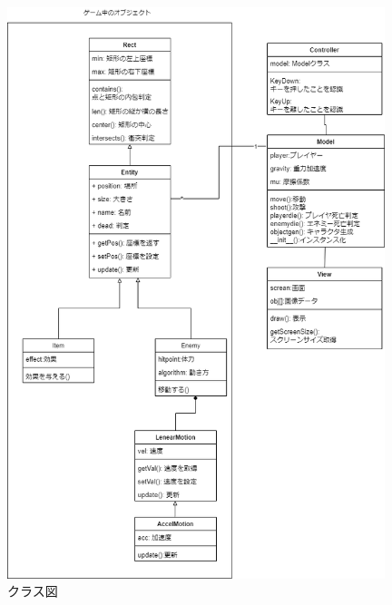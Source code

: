 \documentclass[11pt,a4paper]{jsarticle}
\begin{document}
\begin{figure}[htbp]
	\centering
	\includegraphics[width=110mm]{class.png}
	\caption{クラス図}
\end{figure}
\end{document}
